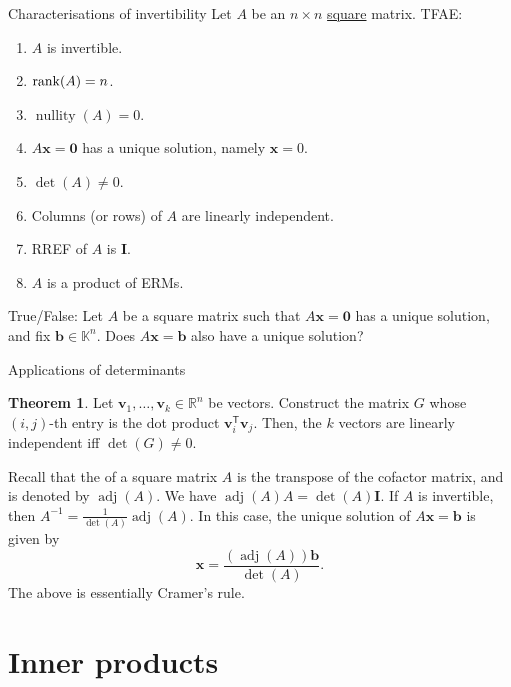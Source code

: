 \documentclass[dvipsnames]{beamer}
\newcommand{\TT}{\mathsf{T}}
\DeclareMathOperator{\nullity}{nullity}
\DeclareMathOperator{\adj}{adj}
\theoremstyle{definition}
\newtheorem{thm}{Theorem}
\begin{document}
\begin{frame}{Characterisations of invertibility}
    Let $A$ be an $n \times n$ \underline{square} matrix. TFAE: \pause
    \begin{enumerate}[<+->]
        \item $A$ is invertible.
        \item $\operatorname{rank}(A) = n$.
        \item $\nullity(A) = 0$.
        \item $A \mathbf{x} = \mathbf{0}$ has a unique solution, namely $\mathbf{x} = 0$.
        \item $\det(A) \neq 0$.
        \item Columns (or rows) of $A$ are linearly independent.
        \item RREF of $A$ is $\mathbf{I}$.
        \item $A$ is a product of ERMs.
    \end{enumerate} \pause

    True/False: Let $A$ be a square matrix such that $A \mathbf{x} = \mathbf{0}$ has a unique solution, and fix $\mathbf{b} \in \mathbb{K}^{n}$. Does $A \mathbf{x} = \mathbf{b}$ also have a unique solution?
\end{frame}
\begin{frame}{Applications of determinants}
    \begin{thm}
        Let $\mathbf{v}_{1}, \ldots, \mathbf{v}_{k} \in \mathbb{R}^{n}$ be vectors. \pause Construct the matrix $G$ whose $(i, j)$-th entry is the dot product $\mathbf{v}_{i}^{\TT} \mathbf{v}_{j}$. \pause Then, the $k$ vectors are linearly independent iff $\det(G) \neq 0$.
    \end{thm} \pause

    Recall that the  of a square matrix $A$ is the transpose of the cofactor matrix, and is denoted by $\adj(A)$. \pause We have $\adj(A) A = \det(A) \mathbf{I}$. \pause If $A$ is invertible, then $A^{-1} = \frac{1}{\det(A)} \adj(A)$. \pause In this case, the unique solution of $A \mathbf{x} = \mathbf{b}$ is given by
    \begin{equation*} 
        \mathbf{x} = \frac{(\adj(A)) \mathbf{b}}{\det(A)}.
    \end{equation*}
    The above is essentially Cramer's rule.
\end{frame}

\section{Inner products}
\end{document}
